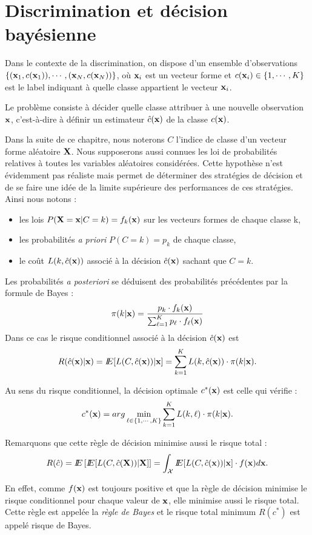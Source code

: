 \section{Discrimination et d\'ecision bay\'esienne}

Dans le contexte de la discrimination, on dispose d'un 
ensemble d'observations $\{(\mbox{\bf x}_1,c(\mbox{\bf x}_1)),\cdots,(\mbox{\bf x}_N,c(\mbox{\bf x}_N))\}$,
o\`u $\mbox{\bf x}_i$ est un vecteur forme et $c(\mbox{\bf x}_i) \in \{1,\cdots,K\}$
est le label indiquant \`a quelle classe appartient le vecteur
$\mbox{\bf x}_i$.

Le probl\`eme consiste \`a d\'ecider  quelle classe attribuer 
\`a une nouvelle observation $\mbox{\bf x}$, c'est-\`a-dire \`a d\'efinir
un estimateur $\hat{c}(\mbox{\bf x})$ de la classe $c(\mbox{\bf x})$. 

Dans la suite de ce chapitre, nous noterons $C$ l'indice de classe d'un vecteur 
forme al\'eatoire $\mbox{\bf X}$. Nous supposerons aussi connues les loi de 
probabilit\'es relatives \`a toutes les variables al\'eatoires consid\'er\'ees. 
Cette hypoth\`ese n'est \'evidemment pas r\'ealiste mais permet
de d\'eterminer des strat\'egies de d\'ecision et de se faire
une id\'ee de la limite sup\'erieure des performances de ces
strat\'egies. Ainsi nous notons :  
\begin{itemize}
\item les lois $P(\mbox{\bf X}=\mbox{\bf x} | C=k)=f_k(\mbox{\bf x})$  sur les vecteurs formes de chaque classe k,
\item les probabilit\'es {\em a priori} $P(C=k)=p_k$ de chaque classe,
\item le co\^ut $L(k,\hat{c}(\mbox{\bf x}))$ associ\'e \`a la d\'ecision 
$\hat{c}(\mbox{\bf x})$ sachant que $C=k$.
\end{itemize}
Les probabilit\'es {\em a posteriori} se d\'eduisent des probabilit\'es pr\'ec\'edentes
par la formule de Bayes :
$$
\pi(k | \mbox{\bf x})=\frac{p_k \cdot f_k(\mbox{\bf x})}{\sum_{\ell=1}^{K} p_{\ell} \cdot f_{\ell}(\mbox{\bf x})}
$$
Dans ce cas le risque conditionnel associ\'e \`a la d\'ecision 
$\hat{c}(\mbox{\bf x})$ est
$$
R(\hat{c}(\mbox{\bf x})|\mbox{\bf x})=I\!\!E[L(C,\hat{c}(\mbox{\bf x}))|\mbox{\bf x}]=\sum_{k=1}^{K} L(k,\hat{c}(\mbox{\bf x}))\cdot \pi(k | \mbox{\bf x}).
$$

Au sens du risque conditionnel, la d\'ecision optimale $c^*(\mbox{\bf x})$ est celle qui
v\'erifie :
$$
c^*(\mbox{\bf x})=arg \min_{\ell \in \{1,\cdots,K \}} \sum_{k=1}^{K} L(k,\ell)\cdot \pi(k | \mbox{\bf x}).
$$ 

Remarquons que cette r\`egle de d\'ecision minimise aussi le risque total :
$$
R(\hat{c})=I\!\!E \left[ I\!\!E[ L(C,\hat{c}(\mbox{\bf X}))|\mbox{\bf X}] \right]=\int_{\cal X} I\!\!E[L(C,\hat{c}(\mbox{\bf x}))|\mbox{\bf x}] \cdot f(\mbox{\bf x}) d\mbox{\bf x}.
$$

En effet, comme $f(\mbox{\bf x})$ est toujours positive et que la r\`egle de d\'ecision 
minimise le risque conditionnel pour chaque valeur de $\mbox{\bf x}$, elle minimise
aussi  le risque total. Cette r\`egle est appel\'ee la {\em r\`egle de 
Bayes} et le risque total minimum $R(c^*)$ est appel\'e risque de Bayes.



